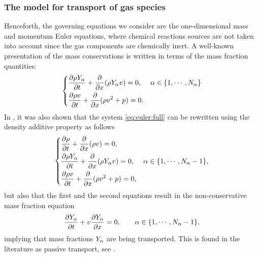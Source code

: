 \subsubsection{The model for transport of gas species}
Henceforth, the governing equations we consider are the one-dimensional mass and momentum Euler equations, where    chemical reactions sources are not taken into account since the gas components are chemically inert. A well-known presentation of the mass conservations is written in terms of the mass fraction quantities:
\begin{equation}
    \left\lbrace
    \begin{aligned}
    & \frac{\partial \rho Y_{\alpha}}{\partial t} + \frac{\partial }{\partial x} ( \rho Y_{\alpha} v)= 0,  & \alpha \in \{1, \cdots, N_\alpha \}\\           
    & \frac{\partial \rho v }{\partial t} + \frac{\partial }{\partial x} (\rho v^2 + p)= 0.         
    \end{aligned}
    \right. \label{eq:euler:full}
\end{equation}
In \cite{LarrouturouFezoui1989}, it was also shown that the system \eqref{eq:euler:full} can be rewritten using the density additive property as follows
\begin{equation}
    \left\lbrace
    \begin{aligned}
        & \frac{\partial \rho }{\partial t} + \frac{\partial }{\partial x} ( \rho  v)= 0,  & \\  
        & \frac{\partial \rho Y_{\alpha}}{\partial t} + \frac{\partial }{\partial x} ( \rho Y_{\alpha} v)= 0,  & \alpha \in \{1, \cdots, N_\alpha-1 \},\\  
        & \frac{\partial \rho v }{\partial t} + \frac{\partial }{\partial x} (\rho v^2 + p)= 0,          
    \end{aligned}
    \right. \label{eq:transport_molarfrac:conservative_form:system}
\end{equation}
but also that the first and the second equations result in the non-conservative mass fraction equation
\begin{equation}
    \frac{\partial Y_{\alpha}}{\partial t} + v \frac{\partial Y_{\alpha}}{\partial x} = 0, \qquad  \alpha \in \{1, \cdots, N_\alpha-1 \},
    \label{eq:transport_massfrac:non_conservative}
\end{equation}
implying that mass fractions $Y_{\alpha}$ are being transported. This is found in the literature as passive transport, see \cite{BouchutBook2004}. 
